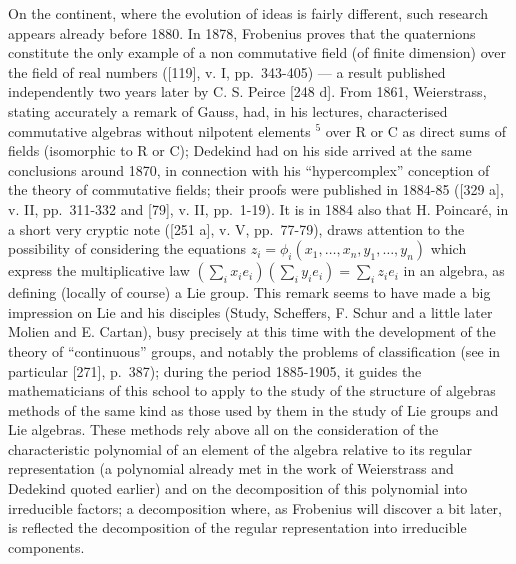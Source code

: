 On the continent, where the evolution of ideas is fairly different, such research appears already before 1880. In 1878, Frobenius proves that the quaternions constitute the only example of a non commutative field (of finite dimension) over the field of real numbers ({[}119{]}, v. I, pp.~343-405) --- a result published independently two years later by C. S. Peirce {[}248 d{]}. From 1861, Weierstrass, stating accurately a remark of Gauss, had, in his lectures, characterised commutative algebras without nilpotent elements \(^{5}\) over R or C as direct sums of fields (isomorphic to R or C); Dedekind had on his side arrived at the same conclusions around 1870, in connection with his ``hypercomplex'' conception of the theory of commutative fields; their proofs were published in 1884-85 ({[}329 a{]}, v. II, pp.~311-332 and {[}79{]}, v. II, pp.~1-19). It is in 1884 also that H. Poincaré, in a short very cryptic note ({[}251 a{]}, v. V, pp.~77-79), draws attention to the possibility of considering the equations \(z_{i} = \phi_{i}(x_{1}, \ldots, x_{n}, y_{1}, \ldots, y_{n})\) which express the multiplicative law \((\sum_{i} x_{i} e_{i})(\sum_{i} y_{i} e_{i}) = \sum_{i} z_{i} e_{i}\) in an algebra, as defining (locally of course) a Lie group. This remark seems to have made a big impression on Lie and his disciples (Study, Scheffers, F. Schur and a little later Molien and E. Cartan), busy precisely at this time with the development of the theory of ``continuous'' groups, and notably the problems of classification (see in particular {[}271{]}, p.~387); during the period 1885-1905, it guides the mathematicians of this school to apply to the study of the structure of algebras methods of the same kind as those used by them in the study of Lie groups and Lie algebras. These methods rely above all on the consideration of the characteristic polynomial of an element of the algebra relative to its regular representation (a polynomial already met in the work of Weierstrass and Dedekind quoted earlier) and on the decomposition of this polynomial into irreducible factors; a decomposition where, as Frobenius will discover a bit later, is reflected the decomposition of the regular representation into irreducible components.

